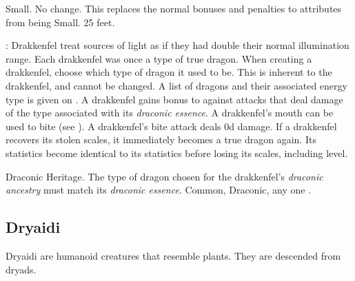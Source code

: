          Small.
         No change. This replaces the normal bonuses and penalties to attributes from being Small.
         25 feet.
        \begin{itemize}
            : Drakkenfel treat sources of light as if they had double their normal illumination range.
             Each drakkenfel was once a type of true dragon.
                When creating a drakkenfel, choose which type of dragon it used to be.
                This is inherent to the drakkenfel, and cannot be changed.
                A list of dragons and their associated energy type is given on .
             A drakkenfel gains  bonus to  against attacks that deal damage of the type associated with its \textit{draconic essence}.
             A drakkenfel's mouth can be used to bite (see ). A drakkenfel's bite attack deals \plus0d damage.
             If a drakkenfel recovers its stolen scales, it immediately becomes a true dragon again.
                Its statistics become identical to its statistics before losing its scales, including level.
        \end{itemize}
         Draconic Heritage. The type of dragon chosen for the drakkenfel's \textit{draconic ancestry} must match its \textit{draconic essence}.
         Common, Draconic, any one .

    \subsection{Dryaidi}

        Dryaidi are humanoid creatures that resemble plants. They are descended from dryads.

